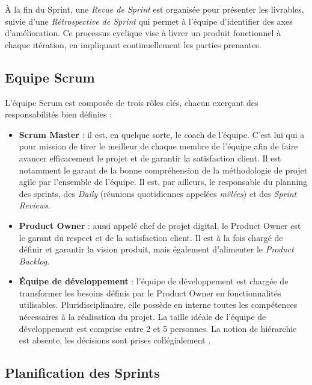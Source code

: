 À la fin du Sprint, une \textit{Revue de Sprint} est organisée pour présenter les livrables, suivie d’une \textit{Rétrospective de Sprint} qui permet à l’équipe d’identifier des axes d’amélioration. Ce processus cyclique vise à livrer un produit fonctionnel à chaque itération, en impliquant continuellement les parties prenantes.

\subsection{Equipe Scrum }


L'équipe Scrum est composée de trois rôles clés, chacun exerçant des responsabilités bien définies :

\begin{itemize}
    [label=\textbullet] \item \textbf{Scrum Master} : il est, en quelque sorte, le coach de l’équipe. C’est lui qui a pour mission de tirer le meilleur de chaque membre de l’équipe afin de faire avancer efficacement le projet et de garantir la satisfaction client. Il est notamment le garant de la bonne compréhension de la méthodologie de projet agile par l’ensemble de l’équipe. Il est, par ailleurs, le responsable du planning des sprints, des \textit{Daily} (réunions quotidiennes appelées \textit{mêlées}) et des \textit{Sprint Reviews}.
     \vspace{0.5cm}

    \item \textbf{Product Owner} : aussi appelé chef de projet digital, le Product Owner est le garant du respect et de la satisfaction client. Il est à la fois chargé de définir et garantir la vision produit, mais également d’alimenter le \textit{Product Backlog}.
     \vspace{0.5cm}

    \item \textbf{Équipe de développement} : l’équipe de développement est chargée de transformer les besoins définis par le Product Owner en fonctionnalités utilisables. Pluridisciplinaire, elle possède en interne toutes les compétences nécessaires à la réalisation du projet. La taille idéale de l’équipe de développement est comprise entre 2 et 5 personnes. La notion de hiérarchie est absente, les décisions sont prises collégialement \cite{scrum-guide}.
     \vspace{0.5cm}
\end{itemize}




\subsection{Planification des Sprints}

